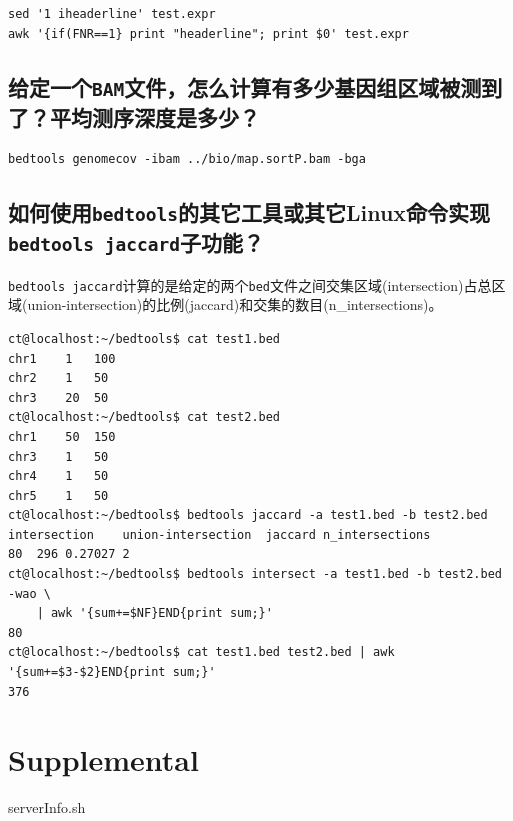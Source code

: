 \documentclass[]{article}
\numberwithin{figure}{section}
\numberwithin{table}{section}
\begin{document}
\begin{verbatim}
sed '1 iheaderline' test.expr
awk '{if(FNR==1} print "headerline"; print $0' test.expr
\end{verbatim}

\hypertarget{bam}{%
\subsection{\texorpdfstring{给定一个\texttt{BAM}文件，怎么计算有多少基因组区域被测到了？平均测序深度是多少？}{给定一个BAM文件，怎么计算有多少基因组区域被测到了？平均测序深度是多少？}}\label{bam}}

\begin{verbatim}
bedtools genomecov -ibam ../bio/map.sortP.bam -bga 
\end{verbatim}

\hypertarget{jaccard}{%
\subsection{\texorpdfstring{如何使用\texttt{bedtools}的其它工具或其它Linux命令实现\texttt{bedtools\ jaccard}子功能？}{如何使用bedtools的其它工具或其它Linux命令实现bedtools jaccard子功能？}}\label{jaccard}}

\texttt{bedtools\ jaccard}计算的是给定的两个\texttt{bed}文件之间交集区域(intersection)占总区域(union-intersection)的比例(jaccard)和交集的数目(n\_intersections)。

\begin{verbatim}
ct@localhost:~/bedtools$ cat test1.bed 
chr1	1	100
chr2	1	50
chr3	20	50
ct@localhost:~/bedtools$ cat test2.bed 
chr1	50	150
chr3	1	50
chr4	1	50
chr5	1	50
ct@localhost:~/bedtools$ bedtools jaccard -a test1.bed -b test2.bed 
intersection	union-intersection	jaccard	n_intersections
80	296	0.27027	2
ct@localhost:~/bedtools$ bedtools intersect -a test1.bed -b test2.bed -wao \
	| awk '{sum+=$NF}END{print sum;}'
80
ct@localhost:~/bedtools$ cat test1.bed test2.bed | awk '{sum+=$3-$2}END{print sum;}'
376
\end{verbatim}

\hypertarget{supplemental}{%
\section{Supplemental}\label{supplemental}}

serverInfo.sh
\end{document}
